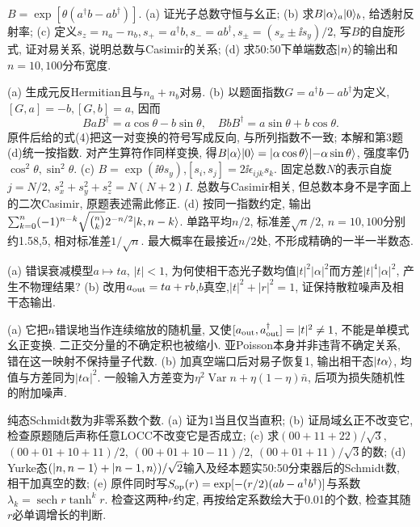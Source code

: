 \begin{exercise}$B=\exp[\theta(a^\dagger b-ab^\dagger)]$. (a) 证光子总数守恒与幺正; (b) 求$B\lvert \alpha\rangle_a\lvert 0\rangle_b$, 给透射反射率; (c) 定义$s_z=n_a-n_b,s_+=a^\dagger b,s_-=ab^\dagger,s_\pm=(s_x\pm\ii s_y)/2$, 写$B$的自旋形式, 证对易关系, 说明总数与Casimir的关系; (d) 求50:50下单端数态$\lvert n\rangle$的输出和$n=10,100$分布宽度.\end{exercise}
\begin{solution}(a) 生成元反Hermitian且与$n_a+n_b$对易. (b) 以题面指数$G=a^\dagger b-ab^\dagger$为定义, $[G,a]=-b,[G,b]=a$, 因而
\[BaB^\dagger=a\cos\theta-b\sin\theta,\quad
 BbB^\dagger=a\sin\theta+b\cos\theta.\]
原件后给的式(4)把这一对变换的符号写成反向, 与所列指数不一致; 本解和第3题(d)统一按指数. 对产生算符作同样变换, 得$B\lvert \alpha\rangle\lvert 0\rangle=\lvert \alpha\cos\theta\rangle\lvert -\alpha\sin\theta\rangle$, 强度率仍$\cos^2\theta,\sin^2\theta$. (c) $B=\exp(\ii\theta s_y)$,$[s_i,s_j]=2\ii\epsilon_{ijk}s_k$. 固定总数$N$的表示自旋$j=N/2$, $s_x^2+s_y^2+s_z^2=N(N+2)I$. 总数与Casimir相关, 但总数本身不是字面上的二次Casimir, 原题表述需此修正. (d) 按同一指数约定, 输出$\sum_{k=0}^n(-1)^{n-k}\sqrt{\binom nk}2^{-n/2}\lvert k,n-k\rangle$. 单路平均$n/2$, 标准差$\sqrt n/2$, $n=10,100$分别约1.58,5, 相对标准差$1/\sqrt n$. 最大概率在最接近$n/2$处, 不形成精确的一半一半数态.
\end{solution}
\begin{exercise}(a) 错误衰减模型$a\mapsto ta$, $|t|<1$, 为何使相干态光子数均值$|t|^2|\alpha|^2$而方差$|t|^4|\alpha|^2$, 产生不物理结果? (b) 改用$a_{\rm out}=ta+rb$,$b$真空,$|t|^2+|r|^2=1$, 证保持散粒噪声及相干态输出.\end{exercise}
\begin{solution}(a) 它把$n$错误地当作连续缩放的随机量, 又使$[a_{\rm out},a_{\rm out}^\dagger]=|t|^2\ne1$, 不能是单模式幺正变换. 二正交分量的不确定积也被缩小. 亚Poisson本身并非违背不确定关系, 错在这一映射不保持量子代数. (b) 加真空端口后对易子恢复1, 输出相干态$\lvert t\alpha\rangle$, 均值与方差同为$|t\alpha|^2$. 一般输入方差变为$\eta^2\operatorname{Var}n+\eta(1-\eta)\bar n$, 后项为损失随机性的附加噪声.
\end{solution}
\begin{exercise}纯态Schmidt数为非零系数个数. (a) 证为1当且仅当直积; (b) 证局域幺正不改变它, 检查原题随后声称任意LOCC不改变它是否成立; (c) 求$(00+11+22)/\sqrt3$, $(00+01+10+11)/2$, $(00+01+10-11)/2$, $(00+01+11)/\sqrt3$的数; (d) Yurke态$(\lvert n,n-1\rangle+\lvert n-1,n\rangle)/\sqrt2$输入及经本题实50:50分束器后的Schmidt数, 相干加真空的数; (e) 原件同时写$S_{\rm op}(r)=\exp[-(r/2)(ab-a^\dagger b^\dagger)]$与系数$\lambda_k=\operatorname{sech}r\tanh^kr$. 检查这两种$r$约定, 再按给定系数绘大于0.01的个数, 检查其随$r$必单调增长的判断.\end{exercise}
